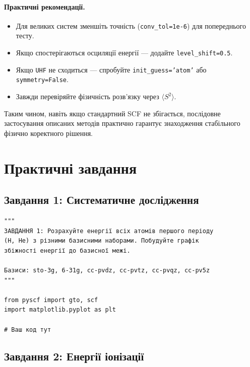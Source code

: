 \paragraph{Практичні рекомендації.}
\begin{itemize}
    \item Для великих систем зменшіть точність (\texttt{conv\_tol=1e-6}) для попереднього тесту.
    \item Якщо спостерігаються осциляції енергії --- додайте \texttt{level\_shift=0.5}.
    \item Якщо \texttt{UHF} не сходиться --- спробуйте \texttt{init\_guess='atom'} або \texttt{symmetry=False}.
    \item Завжди перевіряйте фізичність розв’язку через $\langle S^2 \rangle$.
\end{itemize}

Таким чином, навіть якщо стандартний SCF не збігається,
послідовне застосування описаних методів практично гарантує знаходження стабільного фізично коректного рішення.



\section{Практичні завдання}

\subsection{Завдання 1: Систематичне дослідження}

\begin{verbatim}
"""
ЗАВДАННЯ 1: Розрахуйте енергії всіх атомів першого періоду
(H, He) з різними базисними наборами. Побудуйте графік
збіжності енергії до базисної межі.

Базиси: sto-3g, 6-31g, cc-pvdz, cc-pvtz, cc-pvqz, cc-pv5z
"""

from pyscf import gto, scf
import matplotlib.pyplot as plt

# Ваш код тут
\end{verbatim}

\subsection{Завдання 2: Енергії іонізації}

